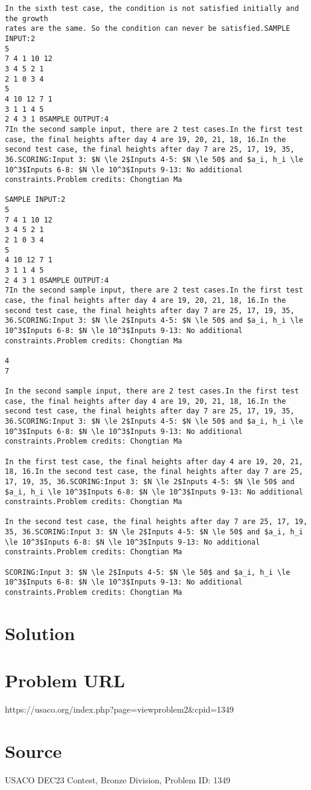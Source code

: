 \documentclass[12pt]{article}
\begin{document}
\begin{verbatim}
In the sixth test case, the condition is not satisfied initially and the growth
rates are the same. So the condition can never be satisfied.SAMPLE INPUT:2
5
7 4 1 10 12
3 4 5 2 1
2 1 0 3 4
5
4 10 12 7 1
3 1 1 4 5
2 4 3 1 0SAMPLE OUTPUT:4
7In the second sample input, there are 2 test cases.In the first test case, the final heights after day 4 are 19, 20, 21, 18, 16.In the second test case, the final heights after day 7 are 25, 17, 19, 35, 36.SCORING:Input 3: $N \le 2$Inputs 4-5: $N \le 50$ and $a_i, h_i \le 10^3$Inputs 6-8: $N \le 10^3$Inputs 9-13: No additional constraints.Problem credits: Chongtian Ma

SAMPLE INPUT:2
5
7 4 1 10 12
3 4 5 2 1
2 1 0 3 4
5
4 10 12 7 1
3 1 1 4 5
2 4 3 1 0SAMPLE OUTPUT:4
7In the second sample input, there are 2 test cases.In the first test case, the final heights after day 4 are 19, 20, 21, 18, 16.In the second test case, the final heights after day 7 are 25, 17, 19, 35, 36.SCORING:Input 3: $N \le 2$Inputs 4-5: $N \le 50$ and $a_i, h_i \le 10^3$Inputs 6-8: $N \le 10^3$Inputs 9-13: No additional constraints.Problem credits: Chongtian Ma

4
7

In the second sample input, there are 2 test cases.In the first test case, the final heights after day 4 are 19, 20, 21, 18, 16.In the second test case, the final heights after day 7 are 25, 17, 19, 35, 36.SCORING:Input 3: $N \le 2$Inputs 4-5: $N \le 50$ and $a_i, h_i \le 10^3$Inputs 6-8: $N \le 10^3$Inputs 9-13: No additional constraints.Problem credits: Chongtian Ma

In the first test case, the final heights after day 4 are 19, 20, 21, 18, 16.In the second test case, the final heights after day 7 are 25, 17, 19, 35, 36.SCORING:Input 3: $N \le 2$Inputs 4-5: $N \le 50$ and $a_i, h_i \le 10^3$Inputs 6-8: $N \le 10^3$Inputs 9-13: No additional constraints.Problem credits: Chongtian Ma

In the second test case, the final heights after day 7 are 25, 17, 19, 35, 36.SCORING:Input 3: $N \le 2$Inputs 4-5: $N \le 50$ and $a_i, h_i \le 10^3$Inputs 6-8: $N \le 10^3$Inputs 9-13: No additional constraints.Problem credits: Chongtian Ma

SCORING:Input 3: $N \le 2$Inputs 4-5: $N \le 50$ and $a_i, h_i \le 10^3$Inputs 6-8: $N \le 10^3$Inputs 9-13: No additional constraints.Problem credits: Chongtian Ma
\end{verbatim}

\section*{Solution}


\section*{Problem URL}
https://usaco.org/index.php?page=viewproblem2&cpid=1349

\section*{Source}
USACO DEC23 Contest, Bronze Division, Problem ID: 1349
\end{document}
